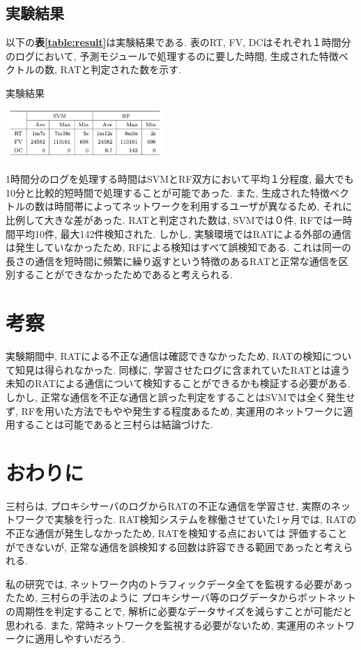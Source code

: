 \documentclass[twocolumn,10pt]{ltjsarticle}
\begin{document}
\subsection{実験結果}
以下の\textbf{表\ref{table:result}}は実験結果である. 表のRT, FV, DCはそれぞれ１時間分のログにおいて, 
予測モジュールで処理するのに要した時間, 生成された特徴ベクトルの数, RATと判定された数を示す. 

\begin{table}[htb]
    \caption{実験結果}
    \label{table:result}
    \centering
    \includegraphics[width=6cm]{images/【調査】プロキシサーバのログを用いたRATの検知/result.png}
\end{table}

1時間分のログを処理する時間はSVMとRF双方において平均１分程度, 最大でも10分と比較的短時間で処理することが可能であった. 
また, 生成された特徴ベクトルの数は時間帯によってネットワークを利用するユーザが異なるため, それに比例して大きな差があった. 
RATと判定された数は, SVMでは０件, RFでは一時間平均10件, 最大142件検知された. 
しかし, 実験環境ではRATによる外部の通信は発生していなかったため, RFによる検知はすべて誤検知である. 
これは同一の長さの通信を短時間に頻繁に繰り返すという特徴のあるRATと正常な通信を区別することができなかったためであると考えられる. 

\section{考察}
実験期間中, RATによる不正な通信は確認できなかったため, RATの検知について知見は得られなかった. 
同様に, 学習させたログに含まれていたRATとは違う未知のRATによる通信について検知することができるかも検証する必要がある. 
しかし, 正常な通信を不正な通信と誤った判定をすることはSVMでは全く発生せず, RFを用いた方法でもやや発生する程度あるため, 
実運用のネットワークに適用することは可能であると三村らは結論づけた. 

\section{おわりに}
三村らは, プロキシサーバのログからRATの不正な通信を学習させ, 実際のネットワークで実験を行った. 
RAT検知システムを稼働させていた1ヶ月では, RATの不正な通信が発生しなかったため, RATを検知する点においては
評価することができないが, 正常な通信を誤検知する回数は許容できる範囲であったと考えられる. \par
私の研究では, ネットワーク内のトラフィックデータ全てを監視する必要があったため, 三村らの手法のように
プロキシサーバ等のログデータからボットネットの周期性を判定することで, 解析に必要なデータサイズを減らすことが可能だと思われる. 
また, 常時ネットワークを監視する必要がないため, 実運用のネットワークに適用しやすいだろう. 



\end{document}
